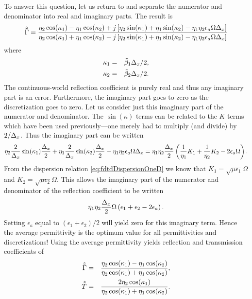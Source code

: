 To answer this question, let us return to  and
separate the numerator and denominator into real and imaginary parts.
The result is
\begin{equation}
  \hat{\tilde{\Gamma}} = \frac
   {\eta_2\cos(\kappa_1) - \eta_1\cos(\kappa_2) +
     j\left[\eta_2\sin(\kappa_1) + \eta_1\sin(\kappa_2)
      -\eta_1\eta_2\epsilon_a\Omega\Delta_x\right]}
   {\eta_2\cos(\kappa_1) + \eta_1\cos(\kappa_2) -
     j\left[\eta_2\sin(\kappa_1) + \eta_1\sin(\kappa_2)
      -\eta_1\eta_2\epsilon_a\Omega\Delta_x\right]}
\end{equation}
where
\begin{eqnarray}
  \kappa_1 &=& \tilde{\beta}_1\Delta_x/2, \\
  \kappa_2 &=& \tilde{\beta}_2\Delta_x/2.
\end{eqnarray}
The continuous-world reflection coefficient is purely real and thus
any imaginary part is an error.  Furthermore, the imaginary part goes
to zero as the discretization goes to zero.  Let us consider just this
imaginary part of the numerator and denominator.  The $\sin(\kappa)$
terms can be related to the $K$ terms which have been used
previously---one merely had to multiply (and divide) by $2/\Delta_x$.
Thus the imaginary part can be written
\begin{equation}
  \eta_2\frac{2}{\Delta_x}\sin(\kappa_1)\frac{\Delta_x}{2} +
  \eta_1\frac{2}{\Delta_x}\sin(\kappa_2)\frac{\Delta_x}{2} -
  \eta_1\eta_2\epsilon_a\Omega\Delta_x
   =
  \eta_1\eta_2\frac{\Delta_x}{2}\left(\frac{1}{\eta_1}K_1 + 
                    \frac{1}{\eta_2}K_2 -
                    2\epsilon_a\Omega\right).
\end{equation}
From the dispersion relation \ref{eq:fdtdDispersionOneD} we know that
$K_1=\sqrt{\mu\epsilon_1}\Omega$ and $K_2=\sqrt{\mu\epsilon_2}\Omega$.
This allows the imaginary part of the numerator and denominator of the
reflection coefficient to be written
\begin{equation}
  \eta_1\eta_2\frac{\Delta_x}{2}\Omega
  \left(\epsilon_1 + \epsilon_2 - 2 \epsilon_a\right).
\end{equation}
Setting $\epsilon_a$ equal to $(\epsilon_1+\epsilon_2)/2$ will yield
zero for this imaginary term.  Hence the average permittivity is the
optimum value for all permittivities and discretizations!  Using the
average permittivity yields reflection and transmission coefficients of 
\begin{eqnarray}
  \hat{\tilde{\Gamma}} &=& 
  \frac
   {\eta_2\cos(\kappa_1) - \eta_1\cos(\kappa_2)}
   {\eta_2\cos(\kappa_1) + \eta_1\cos(\kappa_2)}, \\
  \hat{\tilde{T}} &=& 
  \frac
   {2\eta_2\cos(\kappa_1)}
   {\eta_2\cos(\kappa_1) + \eta_1\cos(\kappa_2)}.
\end{eqnarray}
